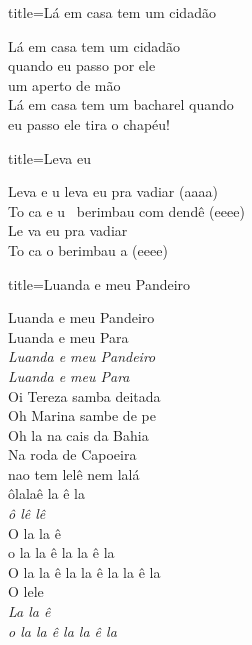 \documentclass[fontsize=14pt, paper=a4, twoside, DIV=20]{scrreprt} %
\begin{document}
\begin{multicols*}{2}
\begin{song}{title={Lá em casa tem um cidadão}}
        \begin{verse*}
            Lá em casa tem um cidadão\\
            quando eu passo por ele \\ 
            um aperto de mão\\
            Lá em casa tem um bacharel quando\\
            eu passo ele tira o chapéu!\\
        \end{verse*}
\end{song}
\begin{song}{title={Leva eu}}
        \begin{verse*}
            Leva e u leva eu pra vadiar (aaaa)\\
            To ca e u \ berimbau com dendê (eeee)\\
            Le va eu pra vadiar\\
            To ca o berimbau a (eeee)\\
        \end{verse*}
\end{song}

\begin{song}{title={Luanda e meu Pandeiro}}
        \begin{verse*}
            Luanda e meu Pandeiro\\
            Luanda e meu Para\\
            \textit{Luanda e meu Pandeiro}\\
            \textit{Luanda e meu Para}\\
            Oi Tereza samba deitada\\
            Oh Marina sambe de pe\\
            Oh la na cais da Bahia\\
            Na roda de Capoeira\\
            nao tem lelê nem lalá\\
            ôlalaê la ê la\\
            \textit{ô lê lê}\\
            O la la ê\\
            o la la ê la la ê la\\
            O la la ê la la ê la la ê la\\
            O lele\\
            \textit{La la ê}\\
            \textit{o la la ê la la ê la}\\
        \end{verse*}
\end{song}


\end{multicols*}
\end{document}
